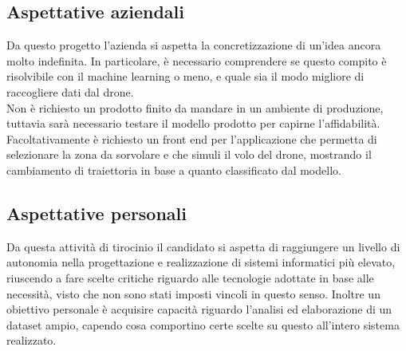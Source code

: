 \subsection{Aspettative aziendali}
Da questo progetto l'azienda si aspetta la concretizzazione di un'idea ancora molto indefinita. In particolare, è necessario comprendere se questo compito
è risolvibile con il machine learning o meno, e quale sia il modo migliore di raccogliere dati dal drone.\\
Non è richiesto un prodotto finito da mandare in un ambiente di produzione, tuttavia sarà necessario testare il modello prodotto per capirne l'affidabilità.\\
Facoltativamente è richiesto un front end per l'applicazione che permetta di selezionare la zona da sorvolare e che simuli il volo del drone, mostrando il cambiamento
di traiettoria in base a quanto classificato dal modello.

\subsection{Aspettative personali}
Da questa attività di tirocinio il candidato si aspetta di raggiungere un livello di autonomia nella progettazione e realizzazione di sistemi informatici più elevato,
riuscendo a fare scelte critiche riguardo alle tecnologie adottate in base alle necessità, visto che non sono stati imposti vincoli in questo senso.
Inoltre un obiettivo personale è acquisire capacità riguardo l'analisi ed elaborazione di un dataset ampio, capendo cosa comportino certe scelte su questo
all'intero sistema realizzato.

